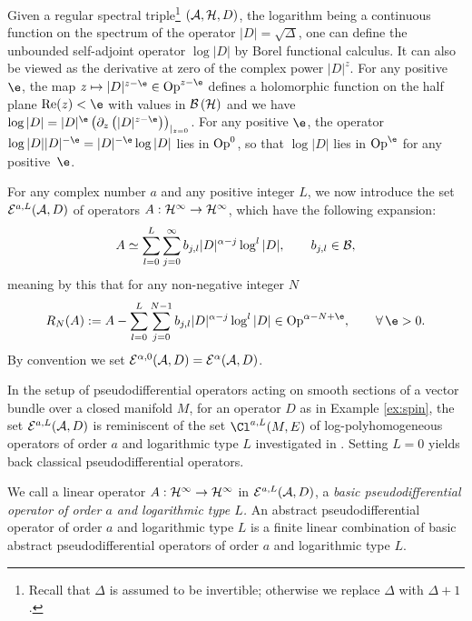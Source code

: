 Given a regular spectral triple\footnote{Recall that $\Delta$ is assumed to be
  invertible; otherwise we replace $\Delta$ with $\Delta+1$.}
$({\cal A}, {\cal H}, D)$,    the logarithm being a continuous
  function on the spectrum of the
operator
$\vert D\vert=\sqrt{\Delta}$,  one can
def\/ine the
unbounded self-adjoint operator $\log \vert D\vert$ by Borel functional
 calculus. It can  also be viewed as
the derivative at zero of the complex power $\vert D\vert^z$.  For any positive $\e$, the map  $z\mapsto \vert D\vert^{z-\e}\in {\rm Op}^{z-\e}$
 def\/ines a holomorphic  function on the half plane ${\rm Re}(z)<\e$ with
values  in ${\cal B}\left({\cal H}\right)$ and we have
$\log \vert D\vert =\vert D\vert^{\e}
 \left(\partial_z \left( \vert D\vert^{z-\e}\right)\right)_{\vert_{z=0}}
 $.
For any positive $\e$, the operator $ \log \vert D\vert   \vert D\vert^{-\e}=
\vert D\vert^{-\e}  \log \vert D\vert$ lies in   ${\rm Op}^0$, so that   $\log
\vert D\vert$ lies  in ${\rm Op}^\e$ for any positive~$\e$.


 For any complex number $a$ and any positive integer $L$,  we now introduce
 the set
${\cal E}^{a, L}({\cal A}, D) $   of
operators $A:{\cal H}^\infty\to {\cal H}^\infty$, which have the following expansion:
\[
A\simeq \sum_{l=0}^L\sum_{j=0}^\infty b_{j,l} \vert D\vert^{\alpha-j}  \log^l \vert D\vert, \qquad b_{j, l}\in {\cal
  B},
  \]
   meaning by this that for any non-negative integer $N$
\[
R_N(A):=A-\sum_{l=0}^L\sum_{j=0}^{N-1}  b_{j,l} \vert D\vert^{\alpha-j}  \log^l \vert D\vert  \in {\rm  Op}^{\alpha -N+\e}, \qquad\forall \,  \e>0.
\]
By convention we set  ${\cal E}^{\alpha, 0}({\cal A}, D)=
 {\cal E}^\alpha({\cal A}, D)$.

 \begin{remark} In the setup of pseudodif\/ferential
 operators acting on smooth sections of a vector bundle over a closed manifold
 $M$, for an operator $D$ as in Example \ref{ex:spin}, the set ${\cal E}^{a,
 L}({\cal A}, D)$ is reminiscent of the set $\Cl^{a,L}(M,E)$ of
 log-polyhomogeneous operators of order $a$ and logarithmic type $L$
 investigated in \cite{L}. Setting $L=0$ yields back classical
 pseudodif\/ferential operators.
 \end{remark}
We call  a linear operator $A: {\cal
   H}^\infty \to {\cal H}^\infty$ in ${\cal E}^{a, L}({\cal A}, D)$,  a {\it   basic    pseudodif\/ferential
   opera\-tor of order
 $a$ and   logarithmic  type $L$.} An abstract pseudodif\/ferential operator of
 order $a$ and logarithmic type $L$ is a f\/inite linear combination of basic
 abstract pseudodif\/ferential operators of order $a$ and logarithmic type $L$.


